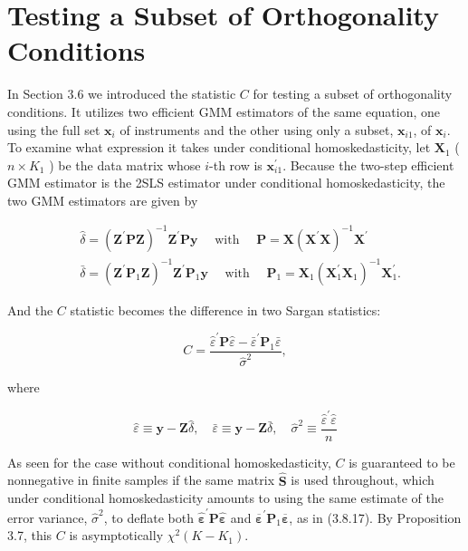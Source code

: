 \documentclass[10pt]{article}
\begin{document}
\section*{Testing a Subset of Orthogonality Conditions}
In Section 3.6 we introduced the statistic $C$ for testing a subset of orthogonality conditions. It utilizes two efficient GMM estimators of the same equation, one using the full set $\mathbf{x}_{i}$ of instruments and the other using only a subset, $\mathbf{x}_{i 1}$, of $\mathbf{x}_{i}$. To examine what expression it takes under conditional homoskedasticity, let $\mathbf{X}_{1}$ ( $n \times K_{1}$ ) be the data matrix whose $i$-th row is $\mathbf{x}_{i 1}^{\prime}$. Because the two-step efficient GMM estimator is the 2SLS estimator under conditional homoskedasticity, the two GMM estimators are given by


\begin{align*}
& \hat{\delta}=\left(\mathbf{Z}^{\prime} \mathbf{P} \mathbf{Z}\right)^{-1} \mathbf{Z}^{\prime} \mathbf{P} \mathbf{y} \quad \text { with } \quad \mathbf{P}=\mathbf{X}\left(\mathbf{X}^{\prime} \mathbf{X}\right)^{-1} \mathbf{X}^{\prime}  \tag{3.8.15}\\
& \bar{\delta}=\left(\mathbf{Z}^{\prime} \mathbf{P}_{1} \mathbf{Z}\right)^{-1} \mathbf{Z}^{\prime} \mathbf{P}_{1} \mathbf{y} \quad \text { with } \quad \mathbf{P}_{1}=\mathbf{X}_{1}\left(\mathbf{X}_{1}^{\prime} \mathbf{X}_{1}\right)^{-1} \mathbf{X}_{1}^{\prime} . \tag{3.8.16}
\end{align*}


And the $C$ statistic becomes the difference in two Sargan statistics:


\begin{equation*}
C=\frac{\hat{\varepsilon}^{\prime} \mathbf{P} \hat{\varepsilon}-\bar{\varepsilon}^{\prime} \mathbf{P}_{1} \bar{\varepsilon}}{\hat{\sigma}^{2}}, \tag{3.8.17}
\end{equation*}


where

$$
\hat{\varepsilon} \equiv \mathbf{y}-\mathbf{Z} \hat{\delta}, \quad \bar{\varepsilon} \equiv \mathbf{y}-\mathbf{Z} \bar{\delta}, \quad \hat{\sigma}^{2} \equiv \frac{\hat{\varepsilon}^{\prime} \hat{\varepsilon}}{n}
$$

As seen for the case without conditional homoskedasticity, $C$ is guaranteed to be nonnegative in finite samples if the same matrix $\widehat{\mathbf{S}}$ is used throughout, which under conditional homoskedasticity amounts to using the same estimate of the error variance, $\hat{\sigma}^{2}$, to deflate both $\hat{\boldsymbol{\varepsilon}}^{\prime} \mathbf{P} \hat{\boldsymbol{\varepsilon}}$ and $\overline{\boldsymbol{\varepsilon}}^{\prime} \mathbf{P}_{1} \overline{\boldsymbol{\varepsilon}}$, as in (3.8.17). By Proposition 3.7, this $C$ is asymptotically $\chi^{2}\left(K-K_{1}\right)$.
\end{document}
